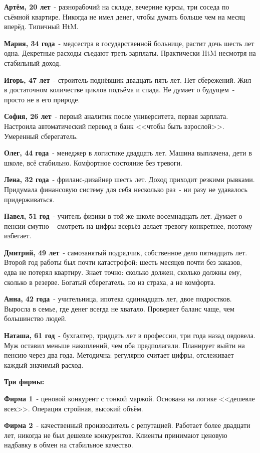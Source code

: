 \documentclass[12pt, a4paper]{article}
\begin{document}
\textbf{Артём, 20 лет}~- разнорабочий на складе, вечерние курсы, три соседа по съёмной квартире. Никогда не имел денег, чтобы думать больше чем на месяц вперёд. Типичный HtM.

\textbf{Мария, 34 года}~- медсестра в государственной больнице, растит дочь шесть лет одна. Декретные расходы съедают треть зарплаты. Практически HtM несмотря на стабильный доход.

\textbf{Игорь, 47 лет}~- строитель-поднёвщик двадцать пять лет. Нет сбережений. Жил в достаточном количестве циклов подъёма и спада. Не думает о будущем~- просто не в его природе.

\textbf{София, 26 лет}~- первый аналитик после университета, первая зарплата. Настроила автоматический перевод в банк <<чтобы быть взрослой>>. Умеренный сберегатель.

\textbf{Олег, 44 года}~- менеджер в логистике двадцать лет. Машина выплачена, дети в школе, всё стабильно. Комфортное состояние без тревоги.

\textbf{Лена, 32 года}~- фриланс-дизайнер шесть лет. Доход приходит резкими рывками. Придумала финансовую систему для себя несколько раз~- ни разу не удавалось придерживаться.

\textbf{Павел, 51 год}~- учитель физики в той же школе восемнадцать лет. Думает о пенсии смутно~- смотреть на цифры всерьёз делает тревогу конкретнее, поэтому избегает.

\textbf{Дмитрий, 49 лет}~- самозанятый подрядчик, собственное дело пятнадцать лет. Второй год работы был почти катастрофой: шесть месяцев почти без заказов, едва не потерял квартиру. Знает точно: сколько должен, сколько должны ему, сколько в резерве. Богатый сберегатель, но из страха, а не комфорта.

\textbf{Анна, 42 года}~- учительница, ипотека одиннадцать лет, двое подростков. Выросла в семье, где денег всегда не хватало. Проверяет баланс чаще, чем большинство людей.

\textbf{Наташа, 61 год}~- бухгалтер, тридцать лет в профессии, три года назад овдовела. Муж оставил меньше накоплений, чем оба предполагали. Планирует выйти на пенсию через два года. Методична: регулярно считает цифры, отслеживает каждый значимый расход.

\bigskip
\textbf{Три фирмы:}

\textbf{Фирма 1}~- ценовой конкурент с тонкой маржой. Основана на логике <<дешевле всех>>. Операция стройная, высокий объём.

\textbf{Фирма 2}~- качественный производитель с репутацией. Работает более двадцати лет, никогда не был дешевле конкурентов. Клиенты принимают ценовую надбавку в обмен на стабильное качество.
\end{document}
